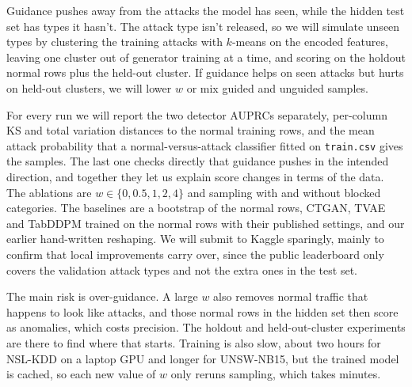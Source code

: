 \documentclass[11pt,a4paper]{article}
\newcommand{\col}[1]{\texttt{#1}}
\begin{document}
Guidance pushes away from the attacks the model has seen, while the hidden test set has types it hasn't. The attack type isn't released, so we will simulate unseen types by clustering the training attacks with $k$-means on the encoded features, leaving one cluster out of generator training at a time, and scoring on the holdout normal rows plus the held-out cluster. If guidance helps on seen attacks but hurts on held-out clusters, we will lower $w$ or mix guided and unguided samples.

For every run we will report the two detector AUPRCs separately, per-column KS and total variation distances to the normal training rows, and the mean attack probability that a normal-versus-attack classifier fitted on \col{train.csv} gives the samples. The last one checks directly that guidance pushes in the intended direction, and together they let us explain score changes in terms of the data. The ablations are $w \in \{0, 0.5, 1, 2, 4\}$ and sampling with and without blocked categories. The baselines are a bootstrap of the normal rows, CTGAN, TVAE and TabDDPM trained on the normal rows with their published settings, and our earlier hand-written reshaping. We will submit to Kaggle sparingly, mainly to confirm that local improvements carry over, since the public leaderboard only covers the validation attack types and not the extra ones in the test set.

The main risk is over-guidance. A large $w$ also removes normal traffic that happens to look like attacks, and those normal rows in the hidden set then score as anomalies, which costs precision. The holdout and held-out-cluster experiments are there to find where that starts. Training is also slow, about two hours for NSL-KDD on a laptop GPU and longer for UNSW-NB15, but the trained model is cached, so each new value of $w$ only reruns sampling, which takes minutes.



\end{document}
